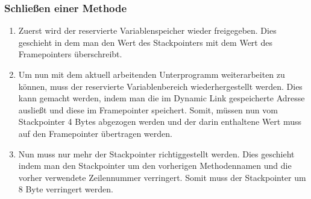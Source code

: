 \subsubsection{Schließen einer Methode}
\begin{enumerate}
 \item Zuerst wird der reservierte Variablenspeicher wieder freigegeben. Dies geschieht in dem man den Wert des Stackpointers mit dem Wert des Framepointers überschreibt.
 \item Um nun mit dem aktuell arbeitenden Unterprogramm weiterarbeiten zu können, muss der reservierte Variablenbereich wiederhergestellt werden. Dies kann gemacht werden, indem man die im Dynamic Link gespeicherte Adresse ausließt und diese im Framepointer speichert. Somit, müssen nun vom Stackpointer 4 Bytes abgezogen werden und der darin enthaltene Wert muss auf den Framepointer übertragen werden.
 \item Nun muss nur mehr der Stackpointer richtiggestellt werden. Dies geschieht indem man den Stackpointer um den vorherigen Methodennamen und die vorher verwendete Zeilennummer verringert. Somit muss der Stackpointer um 8 Byte verringert werden.
\end{enumerate}

